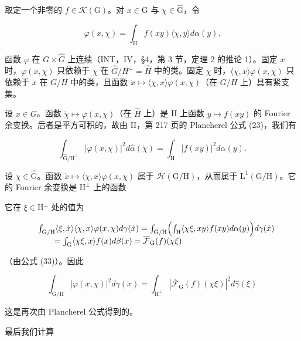 取定一个非零的 \(f\in \mathcal{K}(\mathrm{G})\)。对 \(x\in \mathrm{G}\) 与 \(\chi \in \widehat{\mathrm{G}}\)，令

\[
\varphi (x, \chi) = \int_ {\mathrm{H}} f (x y) \langle \chi , y \rangle d \alpha (y).
\]

函数 \(\varphi\) 在 \(G \times \widehat{G}\) 上连续（INT，IV，§4，第 3 节，定理 2 的推论 1）。固定 \(x\) 时，\(\varphi(x, \chi)\) 只依赖于 \(\chi\) 在 \(\widehat{G}/H^{\perp} = \widehat{H}\) 中的类。固定 \(\chi\) 时，\(\langle \chi, x \rangle \varphi(x, \chi)\) 只依赖于 \(x\) 在 \(G/H\) 中的类，且函数 \(\dot{x} \mapsto \langle \chi, x \rangle \varphi(x, \chi)\)（在 \(G/H\) 上）具有紧支集。

设 \(x \in G\)。函数 \(\dot{\chi} \mapsto \varphi(x, \chi)\)（在 \(\hat{H}\) 上）是 H 上函数 \(y \mapsto f(xy)\) 的 Fourier 余变换。后者是平方可积的，故由 II，第 217 页的 Plancherel 公式 (23)，我们有

\[
\int_ {\widehat {\mathrm{G}} / \mathrm{H} ^ {\perp}} | \varphi (x, \chi) | ^ {2} d \widehat {\alpha} (\dot {\chi}) = \int_ {\mathrm{H}} | f (x y) | ^ {2} d \alpha (y).\tag{35}
\]

 设 \(\chi\in\widehat{\mathrm{G}}\)。函数 \(\dot{x}\mapsto\langle\chi,x\rangle\varphi(x,\chi)\) 属于 \(\mathcal{H}(\mathrm{G}/\mathrm{H})\)，从而属于 \(\mathrm{L}^{1}(\mathrm{G}/\mathrm{H})\)。它的 Fourier 余变换是 \(\mathrm{H}^{\perp}\) 上的函数

它在 \(\xi\in\mathrm{H}^{\perp}\) 处的值为

\[
\begin{array}{r l} & {\int_ {\mathrm{G/H}} \langle \xi , \dot {x} \rangle \langle \chi , x \rangle \varphi (x, \chi) d \gamma (\dot {x}) = \int_ {\mathrm{G/H}} \Bigl (\int_ {\mathrm{H}} \langle \chi \xi , x y \rangle f (x y) d \alpha (y) \Bigr) d \gamma (\dot {x})} \\ & {\qquad = \int_ {\mathrm{G}} \langle \chi \xi , x \rangle f (x) d \beta (x) = \overline {{\mathcal {F}}} _ {\mathrm{G}} (f) (\chi \xi)} \end{array}
\]

（由公式 (33)）。因此

\[
\int_ {\mathrm{G/H}} | \varphi (x, \chi) | ^ {2} d \gamma (\dot {x}) = \int_ {\mathrm{H} ^ {\perp}} | \overline {{\mathcal {F}}} _ {\mathrm{G}} (f) (\chi \xi) | ^ {2} d \widehat {\gamma} (\xi)\tag{36}
\]

这是再次由 Plancherel 公式得到的。

最后我们计算

